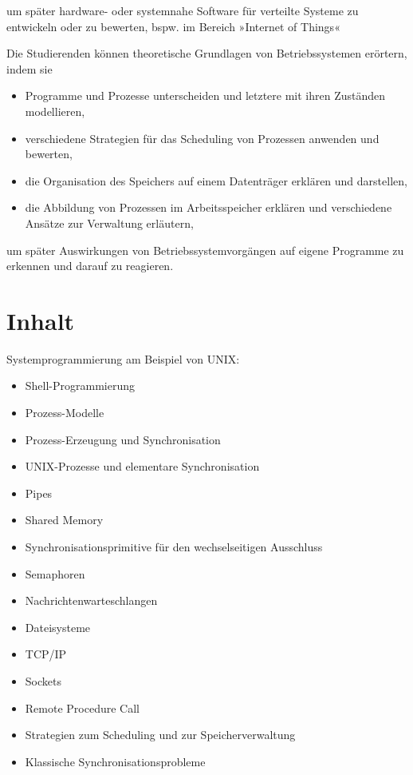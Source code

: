 um später hardware- oder systemnahe Software für verteilte Systeme zu
entwickeln oder zu bewerten, bspw. im Bereich »Internet of Things«

Die Studierenden können theoretische Grundlagen von Betriebssystemen
erörtern, indem sie

\begin{itemize}
\tightlist
\item
  Programme und Prozesse unterscheiden und letztere mit ihren Zuständen
  modellieren,
\item
  verschiedene Strategien für das Scheduling von Prozessen anwenden und
  bewerten,
\item
  die Organisation des Speichers auf einem Datenträger erklären und
  darstellen,
\item
  die Abbildung von Prozessen im Arbeitsspeicher erklären und
  verschiedene Ansätze zur Verwaltung erläutern,
\end{itemize}

um später Auswirkungen von Betriebssystemvorgängen auf eigene Programme
zu erkennen und darauf zu reagieren.

\section*{Inhalt\label{/mi-2017/modulbeschreibungen-bachelor/BA_betriebssysteme-und-verteile-systeme}}\label{inhaltpathlabelmi-2017modulbeschreibungen-bachelorbaux5fbetriebssysteme-und-verteile-systeme}

Systemprogrammierung am Beispiel von UNIX:

\begin{itemize}
\tightlist
\item
  Shell-Programmierung
\item
  Prozess-Modelle
\item
  Prozess-Erzeugung und Synchronisation
\item
  UNIX-Prozesse und elementare Synchronisation
\item
  Pipes
\item
  Shared Memory
\item
  Synchronisationsprimitive für den wechselseitigen Ausschluss
\item
  Semaphoren
\item
  Nachrichtenwarteschlangen
\item
  Dateisysteme
\item
  TCP/IP
\item
  Sockets
\item
  Remote Procedure Call
\item
  Strategien zum Scheduling und zur Speicherverwaltung
\item
  Klassische Synchronisationsprobleme
\end{itemize}

